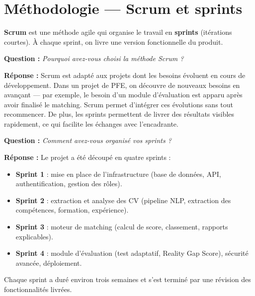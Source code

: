 \documentclass[12pt,a4paper]{article}
\newenvironment{boite}{%
  \def\FrameCommand{\fboxsep=8pt\colorbox{bleulight}}%
  \MakeFramed{\advance\hsize-\width \FrameRestore}%
  \vspace{-4pt}%
}{\endMakeFramed}
\newenvironment{jury}{%
  \def\FrameCommand{\fboxsep=8pt\colorbox{orange!12}}%
  \MakeFramed{\advance\hsize-\width \FrameRestore}%
  \vspace{-4pt}%
}{\endMakeFramed}
\newenvironment{reponse}{%
  \def\FrameCommand{\fboxsep=8pt\colorbox{green!10}}%
  \MakeFramed{\advance\hsize-\width \FrameRestore}%
  \vspace{-4pt}%
}{\endMakeFramed}
\newcommand{\concept}[1]{\textbf{\color{bleu}#1}}
\newcommand{\Q}[1]{\vspace{6pt}\noindent\textbf{\color{orange}Question :} \textit{#1}}
\newcommand{\R}[1]{\noindent\textbf{\color{vert}Réponse :} #1\vspace{6pt}}
\begin{document}
\section{Méthodologie — Scrum et sprints}

\begin{boite}
\concept{Scrum} est une méthode agile qui organise le travail en \textbf{sprints} (itérations courtes).
À chaque sprint, on livre une version fonctionnelle du produit.
\end{boite}

\vspace{8pt}

\begin{jury}
\Q{Pourquoi avez-vous choisi la méthode Scrum ?}
\end{jury}

\begin{reponse}
\R{Scrum est adapté aux projets dont les besoins évoluent en cours de développement.
Dans un projet de PFE, on découvre de nouveaux besoins en avançant — par exemple, le besoin d'un module d'évaluation est apparu après avoir finalisé le matching.
Scrum permet d'intégrer ces évolutions sans tout recommencer.
De plus, les sprints permettent de livrer des résultats visibles rapidement, ce qui facilite les échanges avec l'encadrante.}
\end{reponse}

\begin{jury}
\Q{Comment avez-vous organisé vos sprints ?}
\end{jury}

\begin{reponse}
\R{Le projet a été découpé en quatre sprints :
\begin{itemize}[leftmargin=1.5cm]
  \item \textbf{Sprint 1} : mise en place de l'infrastructure (base de données, API, authentification, gestion des rôles).
  \item \textbf{Sprint 2} : extraction et analyse des CV (pipeline NLP, extraction des compétences, formation, expérience).
  \item \textbf{Sprint 3} : moteur de matching (calcul de score, classement, rapports explicables).
  \item \textbf{Sprint 4} : module d'évaluation (test adaptatif, Reality Gap Score), sécurité avancée, déploiement.
\end{itemize}
Chaque sprint a duré environ trois semaines et s'est terminé par une révision des fonctionnalités livrées.}
\end{reponse}
\end{document}
